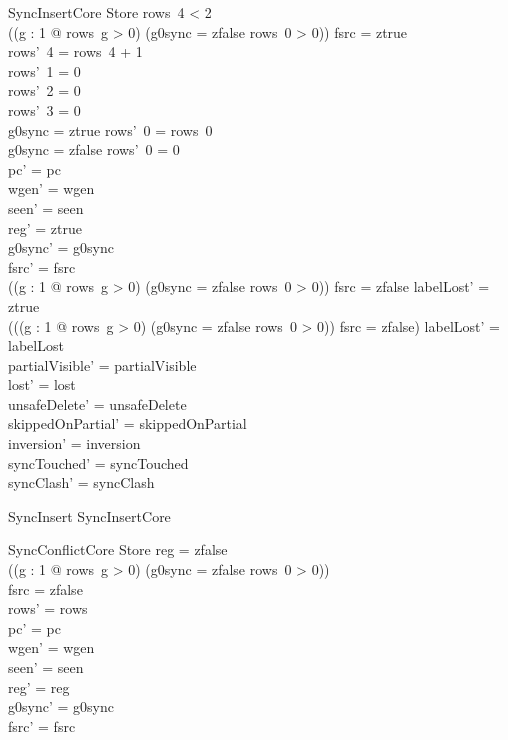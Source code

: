 \documentclass[a4paper,10pt,fleqn]{article}
\begin{document}
\begin{schema}{SyncInsertCore}
\Delta Store
\where
rows~4 < 2 \\
((\exists g : 1  @ rows~g > 0) \lor
  (g0sync = zfalse \land rows~0 > 0)) \implies fsrc = ztrue \\
rows'~4 = rows~4 + 1 \\
rows'~1 = 0 \\
rows'~2 = 0 \\
rows'~3 = 0 \\
g0sync = ztrue \implies rows'~0 = rows~0 \\
g0sync = zfalse \implies rows'~0 = 0 \\
pc' = pc \\
wgen' = wgen \\
seen' = seen \\
reg' = ztrue \\
g0sync' = g0sync \\
fsrc' = fsrc \\
((\exists g : 1  @ rows~g > 0) \lor
  (g0sync = zfalse \land rows~0 > 0)) \land fsrc = zfalse
  \implies labelLost' = ztrue \\
\lnot (((\exists g : 1  @ rows~g > 0) \lor
  (g0sync = zfalse \land rows~0 > 0)) \land fsrc = zfalse)
  \implies labelLost' = labelLost \\
partialVisible' = partialVisible \\
lost' = lost \\
unsafeDelete' = unsafeDelete \\
skippedOnPartial' = skippedOnPartial \\
inversion' = inversion \\
syncTouched' = syncTouched \\
syncClash' = syncClash
\end{schema}

\begin{zed}
SyncInsert  SyncInsertCore
\end{zed}

\begin{schema}{SyncConflictCore}
\Delta Store
\where
reg = zfalse \\
((\exists g : 1  @ rows~g > 0) \lor
  (g0sync = zfalse \land rows~0 > 0)) \\
fsrc = zfalse \\
rows' = rows \\
pc' = pc \\
wgen' = wgen \\
seen' = seen \\
reg' = reg \\
g0sync' = g0sync \\
fsrc' = fsrc
\end{schema}
\end{document}
